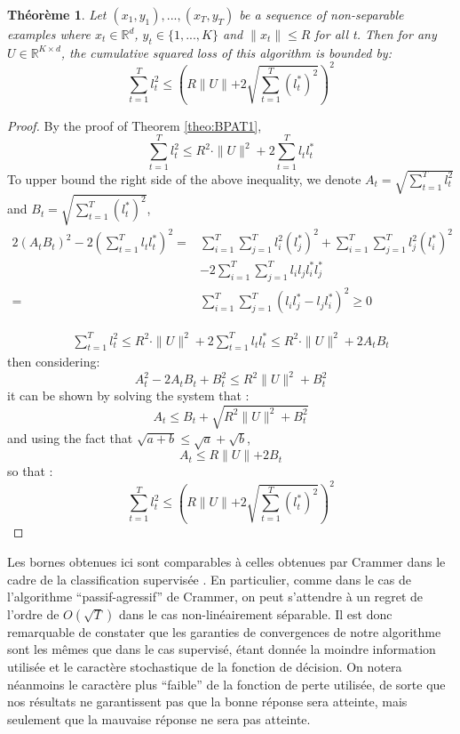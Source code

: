 \documentclass[twocolumn]{article}
\newtheorem{theorem}{Théorème}
\begin{document}
\begin{theorem}
	\label{theo:BPAT2}
	Let $(x_1,y_1),...,(x_T,y_T) $ be a sequence of non-separable examples where  $x_t\in \mathbb{R}^d$, $y_t \in \{1,...,K\}$ and $\parallel{x_t}\parallel \leqslant R$ for all t. Then for any  $U \in \mathbb{R}^{K\times d}$, the cumulative squared loss of this algorithm is bounded by:
	\[\sum_{t=1}^{T}l_t^2 \leqslant \left(R\parallel{U}\parallel+2 \sqrt{\sum_{t=1}^{T}(l_t^{\ast})^2}\right)^2 \]
\end{theorem}
\begin{proof}
	By the proof of Theorem \ref{theo:BPAT1}, 
	\[\sum_{t=1}^{T}l_t^2 \leqslant R^2\cdot \parallel{U}\parallel^2 + 2\sum_{t=1}^{T}l_t l_t^{\ast}\]
	To upper bound the right side of the above inequality, we denote $A_t = \sqrt{\sum_{t=1}^{T}l_t^2}$ and $B_t = \sqrt{\sum_{t=1}^{T}(l_t^{\ast})^2}$, 
	\begin{align}
	2(A_tB_t)^2-2(\sum_{t=1}^{T}l_tl_t^{\ast})^2 =& \sum_{i=1}^{T}\sum_{j=1}^{T}l_i^2(l_j^{\ast})^2+\sum_{i=1}^{T}\sum_{j=1}^{T}l_j^2(l_i^{\ast})^2 \nonumber\\
	&- 2\sum_{i=1}^{T}\sum_{j=1}^{T}l_il_jl_i^{\ast}l_j^{\ast}\nonumber\\
	=& \sum_{i=1}^{T}\sum_{j=1}^{T}(l_il_j^{\ast}-l_jl_i^{\ast})^2 \geqslant 0 \nonumber
	\end{align}
	
	\begin{align}
	\sum_{t=1}^{T}l_t^2 \leqslant R^2 \cdot \parallel{U}\parallel^2+2\sum_{t=1}^{T}l_tl_t^{\ast}\leqslant R^2 \cdot \parallel{U}\parallel^2+2A_tB_t\nonumber
	\end{align}
	then considering:
	\[A_t^2 -2 A_tB_t+B_t^2\leqslant R^2\parallel{U}\parallel^2+B_t^2\]
	it can be shown by solving the system that :
	\[A_t \leqslant B_t+\sqrt{R^2\parallel{U}\parallel^2+B_t^2}\]
	and using the fact that $\sqrt{a+b}\leqslant \sqrt{a}+\sqrt{b}$,
	\[A_t \leqslant R\parallel{U}\parallel+2 B_t\]
	so that :
	\[\sum_{t=1}^{T}l_t^2 \leqslant \left(R\parallel{U}\parallel+2 \sqrt{\sum_{t=1}^{T}(l_t^{\ast})^2}\right)^2 \]
\end{proof}


Les bornes obtenues ici sont comparables  à celles obtenues par Crammer dans le cadre de la classification supervisée  \cite{XXX}. En particulier, comme dans le cas de l'algorithme ``passif-agressif'' de Crammer, on peut s'attendre à un regret de l'ordre de $O(\sqrt{T})$ dans le cas non-linéairement séparable. Il est donc remarquable de constater que les garanties de convergences de notre algorithme sont les mêmes que dans le cas supervisé, étant donnée la moindre information utilisée et le caractère stochastique de la fonction de décision. On notera néanmoins le caractère plus ``faible'' de la fonction de perte utilisée, de sorte que nos résultats ne garantissent pas que la bonne réponse sera atteinte, mais seulement que la mauvaise réponse ne sera pas atteinte.
\end{document}
